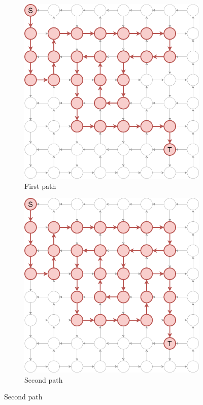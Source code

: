\begin{figure}[ht]
\begin{subfigure}{.5\textwidth}
  \centering
\includegraphics[width=0.8\linewidth]{images/pathiterators/examples-DFS-1.png}
  \caption{First path}
\end{subfigure}
\begin{subfigure}{.5\textwidth}
  \centering
\includegraphics[width=0.8\linewidth]{images/pathiterators/examples-DFS-2.png}
  \caption{Second path}
\end{subfigure}


\end{figure}
